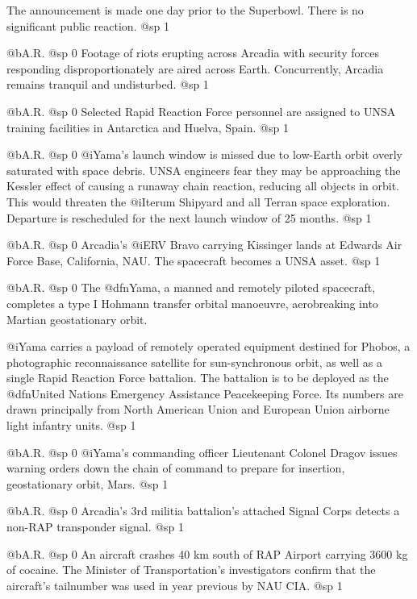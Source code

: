 The announcement is made one day prior to the Superbowl. There is no significant public reaction.
@sp 1

@b{A.R.}
@sp 0
Footage of riots erupting across Arcadia with security forces responding disproportionately are aired across Earth. Concurrently, Arcadia remains tranquil and undisturbed.
@sp 1

@b{A.R.}
@sp 0
Selected Rapid Reaction Force personnel are assigned to UNSA training facilities in Antarctica and Huelva, Spain.
@sp 1

@b{A.R.}
@sp 0
@i{Yama's} launch window is missed due to low-Earth orbit overly saturated with space debris. UNSA engineers fear they may be approaching the Kessler effect of causing a runaway chain reaction, reducing all objects in orbit. This would threaten the @i{Iterum Shipyard} and all Terran space exploration. Departure is rescheduled for the next launch window of 25 months.
@sp 1

@b{A.R.}
@sp 0
Arcadia's @i{ERV Bravo} carrying Kissinger lands at Edwards Air Force Base, California, NAU. The spacecraft becomes a UNSA asset.
@sp 1

@b{A.R.}
@sp 0
The @dfn{Yama}, a manned and remotely piloted spacecraft, completes a type I Hohmann transfer orbital manoeuvre, aerobreaking into Martian geostationary orbit. 

@i{Yama} carries a payload of remotely operated equipment destined for Phobos, a photographic reconnaissance satellite for sun-synchronous orbit, as well as a single Rapid Reaction Force battalion. The battalion is to be deployed as the @dfn{United Nations Emergency Assistance Peacekeeping Force}. Its numbers are drawn principally from North American Union and European Union airborne light infantry units.
@sp 1

@b{A.R.}
@sp 0
@i{Yama's} commanding officer Lieutenant Colonel Dragov issues warning orders down the chain of command to prepare for insertion, geostationary orbit, Mars.
@sp 1

@b{A.R.}
@sp 0
Arcadia's 3rd militia battalion's attached Signal Corps detects a non-RAP transponder signal.
@sp 1

@b{A.R.}
@sp 0
An aircraft crashes 40 km south of RAP Airport carrying 3600 kg of cocaine. The Minister of Transportation's investigators confirm that the aircraft's tailnumber was used in year previous by NAU CIA.
@sp 1


